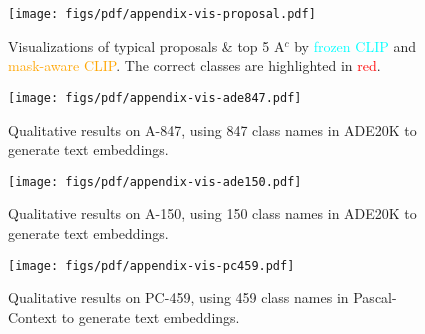 \begin{figure}[ht]
\begin{center}
   \texttt{[image: figs/pdf/appendix-vis-proposal.pdf]}
\end{center}
\vspace{-3mm}
   \caption{
   Visualizations of typical proposals \& top 5 A$^c$ by \textcolor{cyan}{frozen CLIP} and \textcolor{orange}{mask-aware CLIP}. The correct classes are highlighted in \textcolor{red}{red}.
   }
\label{fig:appendix-vis-proposal}
\end{figure}


\begin{figure}
\begin{center}
   \texttt{[image: figs/pdf/appendix-vis-ade847.pdf]}
\end{center}
   \caption{
   Qualitative results on A-847, using 847 class names in ADE20K to generate text embeddings.
   }
\label{fig:vis-a847}
\end{figure}


\begin{figure}
\begin{center}
   \texttt{[image: figs/pdf/appendix-vis-ade150.pdf]}
\end{center}
   \caption{
   Qualitative results on A-150, using 150 class names in ADE20K to generate text embeddings.
   }
\label{fig:vis-a150}
\end{figure}


\begin{figure}
\begin{center}
   \texttt{[image: figs/pdf/appendix-vis-pc459.pdf]}
\end{center}
   \caption{
   Qualitative results on PC-459, using 459 class names in Pascal-Context to generate text embeddings.
   }
\label{fig:vis-pc459}
\end{figure}

